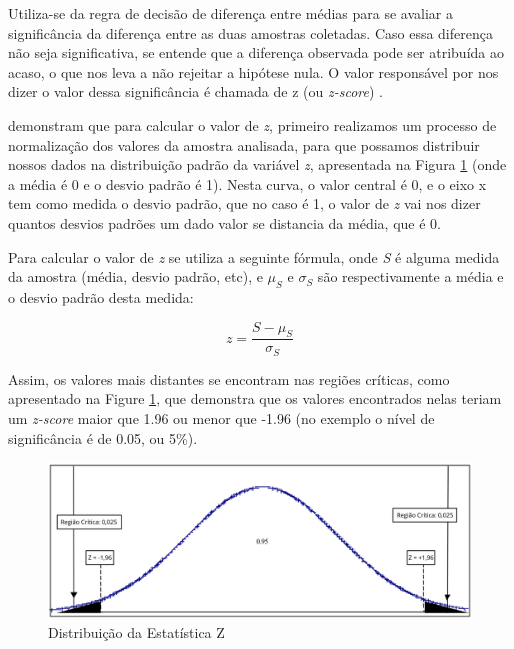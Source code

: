 Utiliza-se da regra de decisão de diferença entre médias para se avaliar a significância da diferença entre as duas amostras coletadas. Caso essa diferença não seja significativa, se entende que a diferença observada pode ser atribuída ao acaso, o que nos leva a não rejeitar a hipótese nula. O valor responsável por nos dizer o valor dessa significância é chamada de z (ou \textit{z-score}) \cite{juristo_basics_2001}.

 demonstram que para calcular o valor de \textit{z}, primeiro realizamos um processo de normalização dos valores da amostra analisada, para que possamos distribuir nossos dados na distribuição padrão da variável \textit{z}, apresentada na Figura \ref{fig:z-score} (onde a média é 0 e o desvio padrão é 1). Nesta curva, o valor central é 0, e o eixo x tem como medida o desvio padrão, que no caso é 1, o valor de \textit{z} vai nos dizer quantos desvios padrões um dado valor se distancia da média, que é 0. 

Para calcular o valor de \textit{z} se utiliza a seguinte fórmula, onde \textit{S} é alguma medida da amostra (média, desvio padrão, etc), e \(\mu_S\) e \(\sigma_S\) são respectivamente a média e o desvio padrão desta medida:

\[
z = \frac{S - \mu_S}{\sigma_S}
\]

Assim, os valores mais distantes se encontram nas regiões críticas, como apresentado na Figure \ref{fig:z-score}, que demonstra que os valores encontrados nelas teriam um \textit{z-score} maior que 1.96 ou menor que -1.96 (no exemplo o nível de significância é de 0.05, ou 5\%).



\begin{figure}
    \centering
    
    \caption{Distribuição da Estatística Z}
    
    \includegraphics[width=1\linewidth]{figuras/z_distr.png}
    
    
    \label{fig:z-score}
\end{figure}


